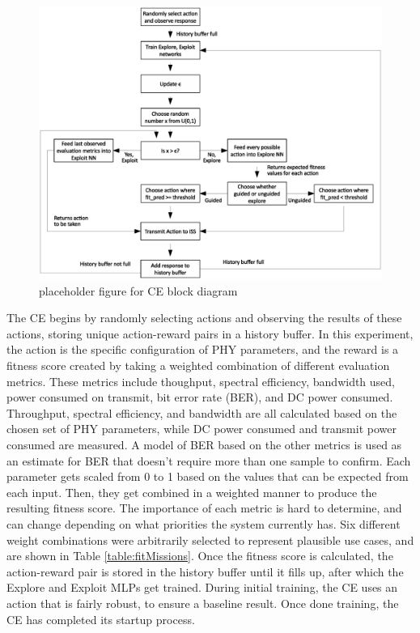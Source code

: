 \begin{landscape}
\begin{figure}[ht]
\includegraphics[width=\paperwidth]{figures/rough_flow_diagram.eps}
\caption{placeholder figure for CE block diagram}\label{fig:ceDataFlow}
\end{figure}
\end{landscape}
\par The CE begins by randomly selecting actions and observing the results of these actions, storing unique action-reward pairs in a history buffer. In this experiment, the action is the specific configuration of PHY parameters, and the reward is a fitness score created by taking a weighted combination of different evaluation metrics. These metrics include thoughput, spectral efficiency, bandwidth used, power consumed on transmit, bit error rate (BER), and DC power consumed. Throughput, spectral efficiency, and bandwidth are all calculated based on the chosen set of PHY parameters, while DC power consumed and transmit power consumed are measured. A model of BER based on the other metrics is used as an estimate for BER that doesn't require more than one sample to confirm. Each parameter gets scaled from 0 to 1 based on the values that can be expected from each input. Then, they get combined in a weighted manner to produce the resulting fitness score. The importance of each metric is hard to determine, and can change depending on what priorities the system currently has. Six different weight combinations were arbitrarily selected to represent plausible use cases, and are shown in Table \ref{table:fitMissions}. Once the fitness score is calculated, the action-reward pair is stored in the history buffer until it fills up, after which the Explore and Exploit MLPs get trained. During initial training, the CE uses an action that is fairly robust, to ensure a baseline result. Once done training, the CE has completed its startup process.
